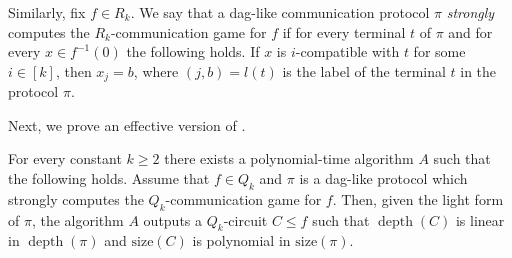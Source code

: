 \documentclass{toc}
\DeclareMathOperator{\depth}{depth}  %
\begin{document}
Similarly, fix $f\in R_k$. We say that a dag-like communication protocol $\pi$ \emph{strongly} computes the $R_k$-communication game for $f$ if for every terminal $t$ of $\pi$ and for every $x\in f^{-1}(0)$ the following holds. If $x$ is $i$-compatible with $t$ for some $i\in [k]$, then $x_j = b$, where $(j, b) = l(t)$ is the label of the terminal $t$ in the protocol $\pi$.



Next, we prove an effective version of .
\begin{theorem}
\label{efficient_Q_k}
For every constant $k\ge 2$ there exists  a polynomial-time algorithm $A$ such that the following holds. Assume that $f\in Q_k$ and $\pi$ is a dag-like protocol which strongly computes  the $Q_k$-communication game for $f$. Then, given the light form of $\pi$, the algorithm $A$ outputs a $Q_k$-circuit $C \le f$ such that $\depth(C)$ is linear in $\depth(\pi)$ and $\mathrm{size}(C)$ is polynomial in $\mathrm{size}(\pi)$. 
\end{theorem}
\end{document}

